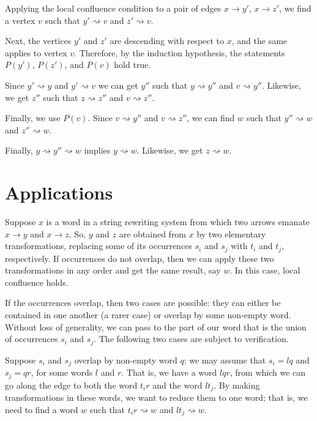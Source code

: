 Applying the local confluence condition to a pair of edges $x \to y'$, $x \to z'$, we find a vertex $v$ such that $y' \rightsquigarrow  v$ and $z' \rightsquigarrow  v$.

Next, the vertices $y'$ and $z'$ are descending with respect to $x$, and the same applies to vertex $v$. Therefore, by the induction hypothesis, the statements $P(y')$, $P(z')$, and $P(v)$ hold true.

Since $y' \rightsquigarrow  y$ and $y' \rightsquigarrow  v$ we can get $y''$ such that $y\rightsquigarrow  y''$ and $v\rightsquigarrow y''$.
Likewise, we get $z''$ such that $z\rightsquigarrow  z''$ and $v\rightsquigarrow  z''$.

Finally, we use $P(v)$.
Since $v\rightsquigarrow  y''$ and $v \rightsquigarrow z''$, we can find $w$ such that $y'' \rightsquigarrow  w$ and $z'' \rightsquigarrow  w$.

Finally, $y \rightsquigarrow y'' \rightsquigarrow  w$ implies $y \rightsquigarrow  w$.
Likewise, we get $z \rightsquigarrow  w$.
\qeds

\section{Applications}

Suppose $x$ is a word in a string rewriting system
from which two arrows emanate $x\to y$ and $x\to z$.
So, $y$ and $z$ are obtained from $x$ by two elementary transformations, replacing some of its occurrences $s_i$ and $s_j$ with $t_i$ and $t_j$, respectively.
If occurrences do not overlap, then we can apply these two transformations in any order and get the same result, say $w$.
In this case, local confluence holds.

If the occurrences overlap, then two cases are possible:
they can either be contained in one another (a rarer case) or overlap by some non-empty word.
Without loss of generality, we can pass to the part of our word that is the union of occurrences $s_i$ and $s_j$.
The following two cases are subject to verification.

 Suppose $s_{i}$ and $s_j$ overlap by non-empty word $q$;
we may assume that  $s_{i}=lq$ and  $s_{j}=qr$, for some words $l$ and $r$.
That is, we have a word $lqr$, from which we can go along the edge to both the word $t_{i}r$ and the word $lt_{j}$.
By making transformations in these words, we want to reduce them to one word; that is, we need to find a word $w$ such that $t_{i}r\rightsquigarrow  w$ and $lt_{j}\rightsquigarrow w$.

